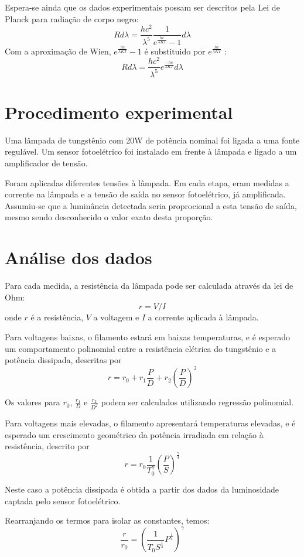\documentclass[brazilian,12pt,a4paper,final]{article}
\begin{document}
Espera-se ainda que os dados experimentais possam ser descritos pela Lei de Planck
para radiação de corpo negro:
\[
R d\lambda=\frac{hc^2}{\lambda^5}\frac{1}{e^\frac{hc}{\lambda KT}-1} d\lambda
\]
Com a aproximação de Wien, $e^\frac{hc}{\lambda KT}-1$ é substituido 
por $e^\frac{hc}{\lambda KT}$ :
\[
R d\lambda=\frac{hc^2}{\lambda^5}e^\frac{-hc}{\lambda KT} d\lambda
\]

\section{Procedimento experimental}
Uma lâmpada de tungstênio com 20W de potência nominal foi ligada a uma fonte regulável. 
Um sensor fotoelétrico foi instalado em frente à lâmpada e ligado a um amplificador de tensão.

Foram aplicadas diferentes tensões à lâmpada.
Em cada etapa, eram medidas a corrente na lâmpada e a tensão de saída no sensor fotoelétrico, já amplificada.
Assumiu-se que a luminância detectada seria proprocional a esta tensão de saída, mesmo sendo desconhecido o valor exato desta proporção.

\section{Análise dos dados}
Para cada medida, 
a resistência da lâmpada pode ser calculada 
através da lei de Ohm: 
$$ r=V/I$$ 
onde $r$ é a resistência, $V$ a voltagem e $I$ a corrente aplicada à lâmpada. 

Para voltagens baixas, o filamento estará em baixas temperaturas,
e é esperado um comportamento polinomial entre a 
resistência elétrica do tungstênio e a potência dissipada, descritas por
$$r=r_0+r_1\frac{P}{D}+r_2(\frac{P}{D})^2$$

Os valores para $r_0$, $\frac{r_1}{D}$ e $\frac{r_2}{D^2}$
podem ser calculados
utilizando regressão polinomial.

Para voltagens mais elevadas, o filamento apresentará temperaturas elevadas, 
e é esperado um crescimento geométrico da 
potência irradiada em relação à resistência, descrito por
$$r=r_0\frac{1}{T_0^\gamma}(\frac{P}{S})^\frac{\gamma}{4}$$

Neste caso a potência dissipada é obtida a partir dos dados da luminosidade captada
pelo sensor fotoelétrico.

Rearranjando os termos para isolar as constantes, temos:
$$\frac{r}{r_0}=(\frac{1}{T_0S^\frac{1}{4}}P^\frac{1}{4})^\gamma$$
\end{document}
